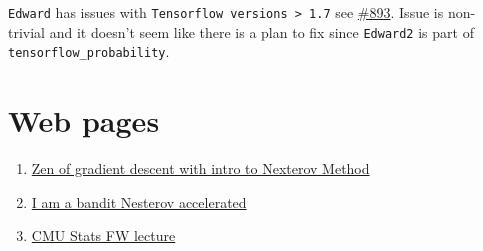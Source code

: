 \documentclass[summaries.tex]{subfiles}
\begin{document}
\label{code:ed_tf_issue}
\texttt{Edward} has issues with \texttt{Tensorflow versions > 1.7} see
\href{https://github.com/blei-lab/edward/issues/893}{\#893}. Issue is non-trivial
and it doesn't seem like there is a plan to fix since \texttt{Edward2} is
part of \texttt{tensorflow\_probability}.

\section{Web pages}
\begin{enumerate}
  \item \href{http://blog.mrtz.org/2013/09/07/the-zen-of-gradient-descent.html}
{Zen of gradient descent with intro to Nexterov Method}  \\
  \item \href{https://blogs.princeton.edu/imabandit/2013/04/01/acceleratedgradientdescent/}
{I am a bandit Nesterov accelerated} 
  \item \href{http://www.stat.cmu.edu/~ryantibs/convexopt-S15/scribes/23-cond-grad-scribed.pdf}
{CMU Stats FW lecture} \label{web:cmu}
\end{enumerate}

\biblio
\end{document}
